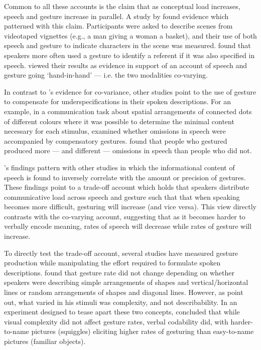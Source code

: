 \documentclass[a4paper,man,natbib]{apa6}
\begin{document}
Common to all these accounts is the claim that as conceptual load increases, speech and gesture increase in parallel.
A \citeyear{So2009} study by \citeauthor{So2009} found evidence which patterned with this claim. 
Participants were asked to describe scenes from videotaped vignettes (e.g., a man giving a woman a basket), and their use of both speech and gesture to indicate characters in the scene was measured.
\citeauthor{So2009} found that speakers more often used a gesture to identify a referent if it was also specified in speech. 
\citeauthor{So2009} viewed their results as evidence in support of an account of speech and gesture going `hand-in-hand' --- i.e. the two modalities co-varying.

In contrast to \citeauthor{So2009}'s evidence for co-variance, other studies point to the use of gesture to compensate for underspecifications in their spoken descriptions.
For an example, in a communication task about spatial arrangements of connected dots of different colours where it was possible to determine the minimal content necessary for each stimulus, \citet{Melinger2004} examined whether omissions in speech were accompanied by compensatory gestures. 
\citeauthor{Melinger2004} found that people who gestured produced more --- and different --- omissions in speech than people who did not. 

\citeauthor{Melinger2004}'s findings pattern with other studies \citep{Bangerter2004, DeRuiter2006, VanderSluis2007} in which the informational content of speech is found to inversely correlate with the amount or precision of gestures. 
These findings point to a trade-off account which holds that speakers distribute communicative load across speech and gesture such that that when speaking becomes more difficult, gesturing will increase (and vice versa). 
This view directly contrasts with the co-varying account, suggesting that as it becomes harder to verbally encode meaning, rates of speech will decrease while rates of gesture will increase. 


To directly test the trade-off account, several studies have measured gesture production while manipulating the effort required to formulate spoken descriptions. 
\citet{DeRuiter1998} found that gesture rate did not change depending on whether speakers were describing simple arrangements of shapes and vertical/horizontal lines or random arrangements of shapes and diagonal lines.
However, as \citet{Morsella2004} point out, what \citeauthor{DeRuiter1998} varied in his stimuli was complexity, and not describability. 
In an experiment designed to tease apart these two concepts, \citet{Morsella2004} concluded that while visual complexity did not affect gesture rates, verbal codability did, with harder-to-name pictures (squiggles) eliciting higher rates of gesturing than easy-to-name pictures (familiar objects).
\end{document}
